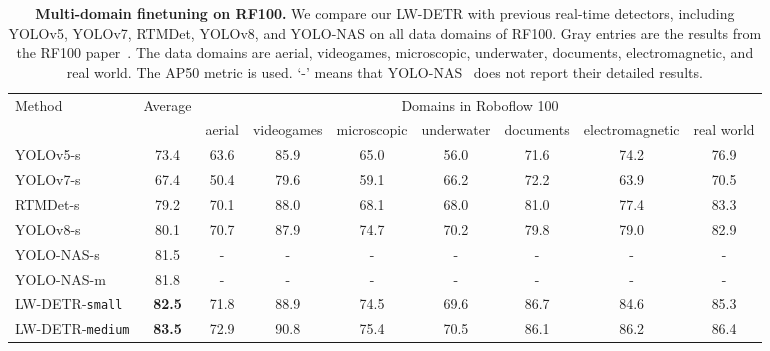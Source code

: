 \documentclass[runningheads]{llncs}
\begin{document}
\begin{table}[t]
  \centering
    \setlength{\tabcolsep}{2.5pt}
    \renewcommand{\arraystretch}{1.41}
    \tiny
  \caption{\textbf{Multi-domain finetuning on RF100.} We compare our LW-DETR with previous real-time detectors, including YOLOv5, YOLOv7, RTMDet, YOLOv8, and YOLO-NAS on all data domains of RF100. \textcolor{gray!50}{Gray} entries are the results from the RF100 paper~\cite{ciaglia2022roboflow}. The data domains are aerial, videogames, microscopic, underwater, documents, electromagnetic, and real world. The AP50 metric is used. `-' means that YOLO-NAS~\cite{supergradients} does not report their detailed results.}
  \vspace{-1mm}
  \begin{tabular}{l|c|ccccccc}
    \multirow{2}{*}{Method} & \multirow{2}{*}{Average} & \multicolumn{7}{c}{Domains in Roboflow 100}\\
    & & aerial & videogames & microscopic & underwater & documents & electromagnetic & real world \\
    \shline
    \textcolor{gray!50}{YOLOv5-s} & \textcolor{gray!50}{73.4} & \textcolor{gray!50}{63.6} & \textcolor{gray!50}{85.9} & \textcolor{gray!50}{65.0} & \textcolor{gray!50}{56.0} & \textcolor{gray!50}{71.6} & \textcolor{gray!50}{74.2} & \textcolor{gray!50}{76.9} \\
    \textcolor{gray!50}{YOLOv7-s} & \textcolor{gray!50}{67.4} & \textcolor{gray!50}{50.4} & \textcolor{gray!50}{79.6} & \textcolor{gray!50}{59.1} & \textcolor{gray!50}{66.2} & \textcolor{gray!50}{72.2} & \textcolor{gray!50}{63.9} & \textcolor{gray!50}{70.5} \\
    \hline
    RTMDet-s & 79.2 & 70.1 & 88.0 & 68.1 & 68.0 & 81.0 & 77.4 & 83.3 \\
    YOLOv8-s & 80.1 & 70.7 & 87.9 & 74.7 & 70.2 & 79.8 & 79.0 & 82.9 \\
    YOLO-NAS-s & 81.5 & - & - & - & - & - & - & - \\
    YOLO-NAS-m & 81.8 & - & - & - & - & - & - & - \\
    \hline
    LW-DETR-\texttt{small} & \textbf{82.5} & 71.8 & 88.9 & 74.5 & 69.6 & 86.7 & 84.6 & 85.3 \\
    LW-DETR-\texttt{medium} & \textbf{83.5} & 72.9 & 90.8 & 75.4 & 70.5 & 86.1 & 86.2 & 86.4 \\
  \end{tabular}
  \label{tab:comparisonsonroboflow}
  \vspace{-3mm}
\end{table}
\end{document}
